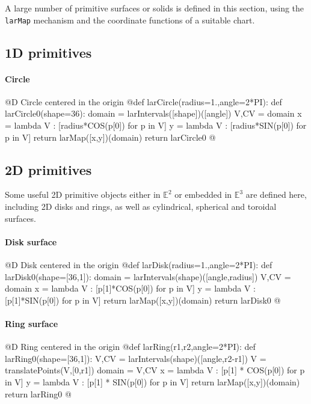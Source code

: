 \documentclass[11pt,oneside]{article}	%
\def\E{\mathbb{E}}
\begin{document}
A large number of primitive surfaces or solids is defined in this section, using the \texttt{larMap} mechanism and the coordinate functions of a suitable chart.

\subsection{1D primitives}

\paragraph{Circle}
@D Circle centered in the origin
@{def larCircle(radius=1.,angle=2*PI):
	def larCircle0(shape=36):
		domain = larIntervals([shape])([angle])
		V,CV = domain
		x = lambda V : [radius*COS(p[0]) for p in V]
		y = lambda V : [radius*SIN(p[0]) for p in V]
		return larMap([x,y])(domain)
	return larCircle0
@}
\subsection{2D primitives}
Some useful 2D primitive objects either in $\E^2$ or embedded in $\E^3$ are defined here, including 2D disks and rings, as well as cylindrical, spherical and toroidal surfaces.

\paragraph{Disk surface}
@D Disk centered in the origin
@{def larDisk(radius=1.,angle=2*PI):
	def larDisk0(shape=[36,1]):
		domain = larIntervals(shape)([angle,radius])
		V,CV = domain
		x = lambda V : [p[1]*COS(p[0]) for p in V]
		y = lambda V : [p[1]*SIN(p[0]) for p in V]
		return larMap([x,y])(domain)
	return larDisk0
@}

\paragraph{Ring surface}
@D Ring centered in the origin
@{def larRing(r1,r2,angle=2*PI):
	def larRing0(shape=[36,1]):
		V,CV = larIntervals(shape)([angle,r2-r1])
		V = translatePoints(V,[0,r1])
		domain = V,CV
		x = lambda V : [p[1] * COS(p[0]) for p in V]
		y = lambda V : [p[1] * SIN(p[0]) for p in V]
		return larMap([x,y])(domain)
	return larRing0
@}
\end{document}

